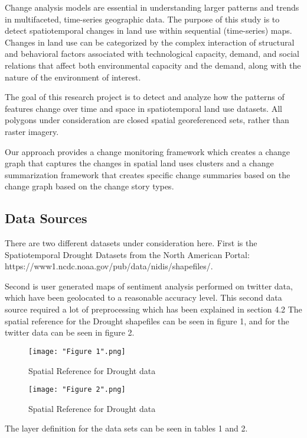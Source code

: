 \documentclass[conference]{IEEEtran}
\begin{document}
Change analysis models are essential in understanding larger patterns and trends in multifaceted, time-series geographic data. The purpose of this study is to detect spatiotemporal changes in land use within sequential (time-series) maps. Changes in land use can be categorized by the complex interaction of structural and behavioral factors associated with technological capacity, demand, and social relations that affect both environmental capacity and the demand, along with the nature of the environment of interest.

 
The goal of this research project is to detect and analyze how the patterns of features change over time and space in spatiotemporal land use datasets. All polygons under consideration are closed spatial  georeferenced sets, rather than raster imagery.

Our approach provides a change monitoring framework which creates a change graph that captures the changes in spatial land uses clusters and a change summarization framework that creates specific change summaries based on the change graph based on the change story types. 

\subsection{Data Sources}

There are two different datasets under consideration here. First is the Spatiotemporal Drought Datasets from the North American Portal: https://www1.ncdc.noaa.gov/pub/data/nidis/shapefiles/.

Second is user generated maps of sentiment analysis performed on twitter data, which have been geolocated to a reasonable accuracy level. This second data source required a lot of preprocessing which has been explained in section 4.2
The spatial reference for the Drought shapefiles can be seen in figure 1, and for the twitter data can be seen in figure 2. 

\begin{figure}[ht]
\centerline{\texttt{[image: "Figure 1".png]}}
\caption{Spatial Reference for Drought data}
\label{Figure 1}
\end{figure}

\begin{figure}[ht]
\centerline{\texttt{[image: "Figure 2".png]}}
\caption{Spatial Reference for Drought data}
\label{Figure 2}
\end{figure}

The layer definition for the data sets can be seen in tables 1 and 2.
\end{document}
